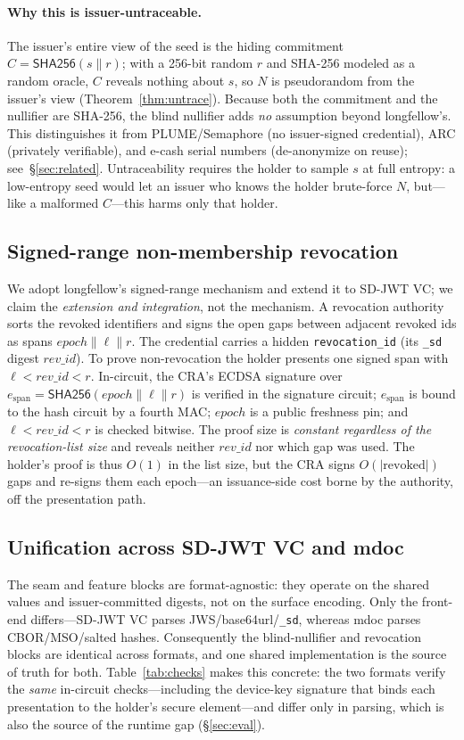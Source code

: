 \documentclass[11pt]{article}
\theoremstyle{plain}
\theoremstyle{definition}
\begin{document}
\paragraph{Why this is issuer-untraceable.} The issuer's entire view of the seed is
the hiding commitment $C=\mathsf{SHA256}(s\|r)$; with a 256-bit random $r$ and SHA-256
modeled as a random oracle, $C$ reveals nothing about $s$, so $N$ is pseudorandom from
the issuer's view (Theorem~\ref{thm:untrace}). Because both the commitment and the
nullifier are SHA-256, the blind nullifier adds \emph{no} assumption beyond
longfellow's. This distinguishes it from PLUME/Semaphore (no issuer-signed credential),
ARC (privately verifiable), and e-cash serial numbers (de-anonymize on reuse);
see~\S\ref{sec:related}. Untraceability requires the holder to sample $s$ at full
entropy: a low-entropy seed would let an issuer who knows the holder brute-force $N$,
but---like a malformed $C$---this harms only that holder.

\subsection{Signed-range non-membership revocation}\label{sec:revoc}
We adopt longfellow's signed-range mechanism and extend it to SD-JWT VC; we claim the
\emph{extension and integration}, not the mechanism. A revocation authority sorts the
revoked identifiers and signs the open gaps between adjacent revoked ids as spans
$\mathit{epoch}\|\ell\|r$. The credential carries a hidden \texttt{revocation\_id}
(its \texttt{\_sd} digest $\mathit{rev\_id}$). To prove non-revocation the holder
presents one signed span with $\ell<\mathit{rev\_id}<r$. In-circuit, the CRA's ECDSA
signature over $e_{\mathrm{span}}=\mathsf{SHA256}(\mathit{epoch}\|\ell\|r)$ is verified
in the signature circuit; $e_{\mathrm{span}}$ is bound to the hash circuit by a fourth
MAC; $\mathit{epoch}$ is a public freshness pin; and $\ell<\mathit{rev\_id}<r$ is
checked bitwise. The proof size is \emph{constant regardless of the revocation-list
size} and reveals neither $\mathit{rev\_id}$ nor which gap was used. The holder's proof
is thus $O(1)$ in the list size, but the CRA signs $O(|\text{revoked}|)$ gaps and
re-signs them each epoch---an issuance-side cost borne by the authority, off the
presentation path.

\subsection{Unification across SD-JWT VC and mdoc}\label{sec:unify}
The seam and feature blocks are format-agnostic: they operate on the shared values and
issuer-committed digests, not on the surface encoding. Only the front-end
differs---SD-JWT VC parses JWS/base64url/\texttt{\_sd}, whereas mdoc parses
CBOR/MSO/salted hashes. Consequently the blind-nullifier and revocation blocks are
identical across formats, and one shared implementation is the source of truth for
both. Table~\ref{tab:checks} makes this concrete: the two formats verify the
\emph{same} in-circuit checks---including the device-key signature that binds each
presentation to the holder's secure element---and differ only in parsing, which is also
the source of the runtime gap (\S\ref{sec:eval}).
\end{document}
